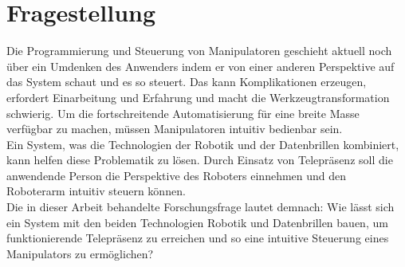 \section{Fragestellung}
  Die Programmierung und Steuerung von Manipulatoren geschieht aktuell noch über ein Umdenken des Anwenders indem er von einer anderen Perspektive auf das System schaut und es so steuert. Das kann Komplikationen erzeugen, erfordert Einarbeitung und Erfahrung und macht die Werkzeugtransformation schwierig. Um die fortschreitende Automatisierung für eine breite Masse verfügbar zu machen, müssen Manipulatoren intuitiv bedienbar sein. \\
  Ein System, was die Technologien der Robotik und der Datenbrillen kombiniert, kann helfen diese Problematik zu lösen. Durch Einsatz von Telepräsenz soll die anwendende Person die Perspektive des Roboters einnehmen und den Roboterarm intuitiv steuern können. \\
  Die in dieser Arbeit behandelte Forschungsfrage lautet demnach:
  Wie lässt sich ein System mit den beiden Technologien Robotik und Datenbrillen bauen, um funktionierende Telepräsenz zu erreichen und so eine intuitive Steuerung eines Manipulators zu ermöglichen?
